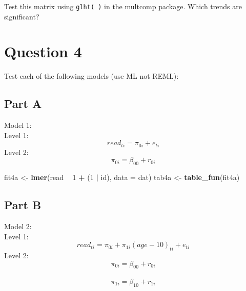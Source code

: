 \documentclass[]{article}
\newenvironment{Shaded}{\begin{snugshade}}{\end{snugshade}}
\newcommand{\KeywordTok}[1]{\textcolor[rgb]{0.13,0.29,0.53}{\textbf{#1}}}
\newcommand{\DataTypeTok}[1]{\textcolor[rgb]{0.13,0.29,0.53}{#1}}
\newcommand{\DecValTok}[1]{\textcolor[rgb]{0.00,0.00,0.81}{#1}}
\newcommand{\StringTok}[1]{\textcolor[rgb]{0.31,0.60,0.02}{#1}}
\newcommand{\OperatorTok}[1]{\textcolor[rgb]{0.81,0.36,0.00}{\textbf{#1}}}
\newcommand{\NormalTok}[1]{#1}
\begin{document}
Test this matrix using \texttt{glht(\ )} in the multcomp package. Which
trends are significant?

\begin{Shaded}
\end{Shaded}

\section{Question 4}\label{question-4}

Test each of the following models (use ML not REML):

\subsection{Part A}\label{part-a-1}

Model 1:\\
Level 1: \[ read_{ti} = \pi_{0i} + e_{ti}\] Level 2:
\[ \pi_{0i} = \beta_{00} + r_{0i}\]

\begin{Shaded}
\begin{Highlighting}[]
\NormalTok{fit4a <-}\StringTok{ }\KeywordTok{lmer}\NormalTok{(read }\OperatorTok{~}\StringTok{ }\DecValTok{1} \OperatorTok{+}\StringTok{ }\NormalTok{(}\DecValTok{1} \OperatorTok{|}\StringTok{ }\NormalTok{id), }\DataTypeTok{data =}\NormalTok{ dat)}
\NormalTok{tab4a <-}\StringTok{ }\KeywordTok{table_fun}\NormalTok{(fit4a)}
\end{Highlighting}
\end{Shaded}

\subsection{Part B}\label{part-b-1}

Model 2:\\
Level 1: \[ read_{ti} = \pi_{0i} + \pi_{1i}(age-10)_{ti} + e_{ti}\]
Level 2: \[ \pi_{0i} = \beta_{00} + r_{0i}\]\\
\[ \pi_{1i} = \beta_{10} + r_{1i}\]
\end{document}
